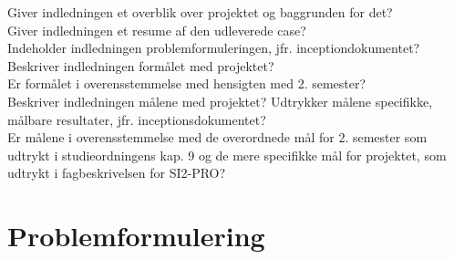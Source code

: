 Giver indledningen et overblik over projektet og baggrunden for det?\\
Giver indledningen et resume af den udleverede case?\\
Indeholder indledningen problemformuleringen, jfr. inceptiondokumentet?\\
Beskriver indledningen formålet med projektet?\\ Er formålet i overensstemmelse med hensigten med 2. semester? \\
Beskriver indledningen målene med projektet? Udtrykker målene specifikke, målbare resultater, jfr. inceptionsdokumentet? \\
Er målene i overensstemmelse med de overordnede mål for 2. semester som udtrykt i studieordningens kap. 9 og de mere specifikke mål for projektet, som udtrykt i fagbeskrivelsen for SI2-PRO?

\section{Problemformulering}


